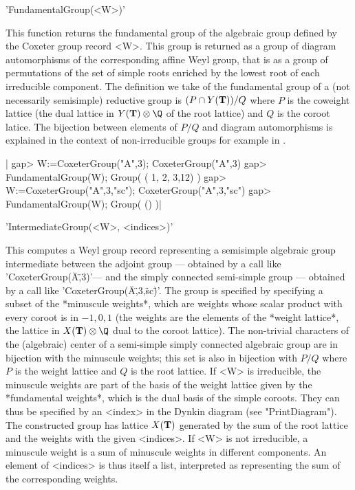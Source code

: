 'FundamentalGroup(<W>)'

This  function returns the fundamental group of the algebraic group defined
by  the Coxeter  group record  <W>. This  group is  returned as  a group of
diagram  automorphisms of the corresponding affine Weyl group, that is as a
group  of permutations of  the set of  simple roots enriched  by the lowest
root  of  each  irreducible  component.  The  definition  we  take  of  the
fundamental  group  of  a  (not  necessarily semisimple) reductive group is
$(P\cap  Y({\mathbf T}))/Q$ where $P$ is the  coweight lattice (the dual lattice in
$Y(\bT)\otimes\Q$  of the root  lattice) and $Q$  is the coroot latice. The
bijection  between elements of $P/Q$ and diagram automorphisms is explained
in   the  context  of  non-irreducible   groups  for  example  in  \cite[\S
3.B]{Bon05}.

|    gap> W:=CoxeterGroup("A",3);
    CoxeterGroup("A",3)
    gap> FundamentalGroup(W);
    Group( ( 1, 2, 3,12) )
    gap> W:=CoxeterGroup("A",3,"sc");
    CoxeterGroup("A",3,"sc")
    gap> FundamentalGroup(W);
    Group( () )|


'IntermediateGroup(<W>, <indices>)'

This computes a Weyl group record representing a semisimple algebraic group
intermediate  between  the  adjoint  group  ---  obtained  by  a  call like
'CoxeterGroup(\"A\",3)'---  and the simply  connected semi-simple group ---
obtained  by  a  call  like  'CoxeterGroup(\"A\",3,\"sc\")'.  The  group is
specified  by specifying  a subset  of the  *minuscule weights*,  which are
weights  whose scalar product with every coroot is in $-1,0,1$ (the weights
are  the elements of the *weight lattice*, the lattice in $X(\bT)\otimes\Q$
dual  to the coroot lattice). The non-trivial characters of the (algebraic)
center  of a semi-simple simply connected  algebraic group are in bijection
with  the minuscule weights; this set is also in bijection with $P/Q$ where
$P$  is  the  weight  lattice  and  $Q$  is  the  root  lattice.  If <W> is
irreducible,  the minuscule  weights are  part of  the basis  of the weight
lattice  given by the *fundamental weights*, which is the dual basis of the
simple  coroots. They  can thus  be specified  by an  <index> in the Dynkin
diagram  (see "PrintDiagram").  The constructed  group has lattice $X({\mathbf T})$
generated  by the sum  of the root  lattice and the  weights with the given
<indices>.  If  <W>  is  not  irreducible,  a  minuscule weight is a sum of
minuscule  weights in different components. An element of <indices> is thus
itself  a list,  interpreted as  representing the  sum of the corresponding
weights.

